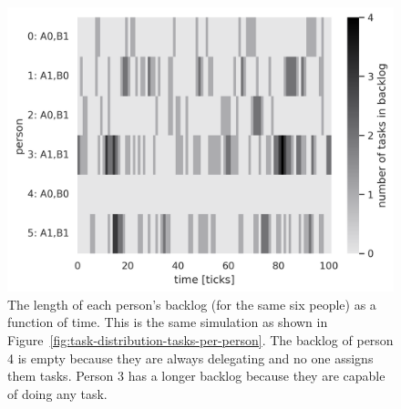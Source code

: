 \begin{figure}[H] %
\centering
\includegraphics[width=1\textwidth]{images/task_distribution_backlog_length_per_person_simCount1_skills2_levels1_taskduration1_people6_social0_ticks100.png}
\caption{The length of each person's backlog (for the same six people) as a function of time. This is the same simulation as shown in Figure~\ref{fig:task-distribution-tasks-per-person}. The backlog of person 4 is empty because they are always delegating and no one assigns them tasks. Person 3 has a longer backlog because they are capable of doing any task.}
\label{fig:task-distribution-backlog-length}
\end{figure}





